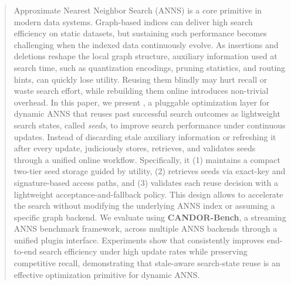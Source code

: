 \begin{abstract} 
Approximate Nearest Neighbor Search (ANNS) is a core primitive in modern data systems.
Graph-based indices can deliver high search efficiency on static datasets, but sustaining such performance becomes challenging when the indexed data continuously evolve. 
As insertions and deletions reshape the local graph structure, auxiliary information used at search time, such as quantization encodings, pruning statistics, and routing hints, can quickly lose utility. Reusing them blindly may hurt recall or waste search effort, while rebuilding them online introduces non-trivial overhead. In this paper, we present \system, a pluggable optimization layer for dynamic ANNS that reuses past successful search outcomes as lightweight search states, called \textit{seeds}, to improve search performance under continuous updates. Instead of discarding stale auxiliary information or refreshing it after every update, \system judiciously stores, retrieves, and validates seeds through a unified online workflow. Specifically, it (1) maintains a compact two-tier seed storage guided by utility, (2) retrieves seeds via exact-key and signature-based access paths, and (3) validates each reuse decision with a lightweight acceptance-and-fallback policy. This design allows \system to accelerate the search without modifying the underlying ANNS index or assuming a specific graph backend. We evaluate \system using \textbf{CANDOR-Bench}, a streaming ANNS benchmark framework, across multiple ANNS backends through a unified plugin interface. Experiments show that \system consistently improves end-to-end search efficiency under high update rates while preserving competitive recall, demonstrating that stale-aware search-state reuse is an effective optimization primitive for dynamic ANNS. 
\end{abstract}